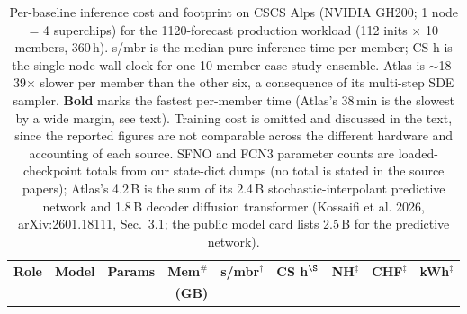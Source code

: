 %
%

\begin{table}
  \centering
  \small
  \setlength{\tabcolsep}{5pt}
  \renewcommand{\arraystretch}{1.15}
  \caption{Per-baseline inference cost and footprint on CSCS Alps (NVIDIA
           GH200; 1 node = 4 superchips) for the 1120-forecast production
           workload (112 inits $\times$ 10 members, 360\,h). s/mbr is the
           median pure-inference time per member; CS h is the single-node
           wall-clock for one 10-member case-study ensemble. Atlas is
           $\sim$18-39$\times$ slower per member than the other six, a
           consequence of its multi-step SDE sampler. \textbf{Bold}
           marks the fastest per-member time (Atlas's 38\,min is the slowest
           by a wide margin, see text). Training cost is
           omitted and discussed in the text, since the reported figures
           are not comparable across the different hardware and accounting
           of each source. SFNO and FCN3 parameter counts are
           loaded-checkpoint totals from our state-dict dumps (no total is
           stated in the source papers); Atlas's 4.2\,B is the sum of its
           2.4\,B stochastic-interpolant predictive network and 1.8\,B
           decoder diffusion transformer (Kossaifi et al. 2026, arXiv:2601.18111, Sec.~3.1; the public model card lists 2.5\,B for the predictive network).}
  \label{tab:inference-cost}
  \begin{tabular}{@{}l l r r r r r r r@{}}
    \toprule
    \textbf{Role}
        & \textbf{Model}
        & \textbf{Params}
        & \textbf{Mem$^{\#}$}
        & \textbf{s/mbr$^{\dag}$}
        & \textbf{CS h$^{\S}$}
        & \textbf{NH$^{\ddag}$}
        & \textbf{CHF$^{\ddag}$}
        & \textbf{kWh$^{\ddag}$} \\
     &  & & \textbf{(GB)} &  &  &  &  &  \\
    \midrule


\end{tabular}
\end{table}
